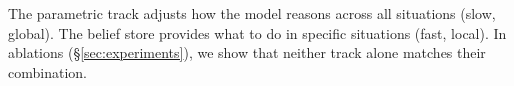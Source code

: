The parametric track adjusts how the model reasons across all situations (slow, global). The belief store provides what to do in specific situations (fast, local). In ablations (\S\ref{sec:experiments}), we show that neither track alone matches their combination.
